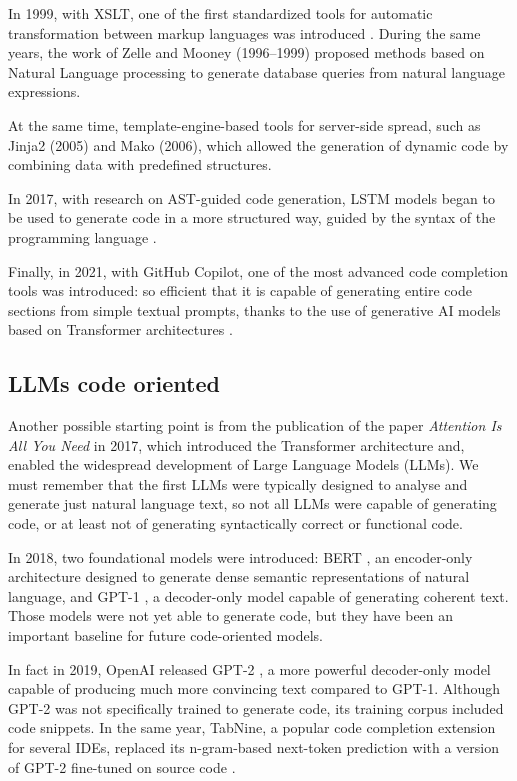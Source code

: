 In 1999, with XSLT, one of the first standardized tools for 
automatic transformation between markup languages was introduced 
\cite{xslt1999}. During the same years, the work of Zelle\cite{zelle1996learning}
and  Mooney\cite{mooney1997nlidb} (1996–1999) 
proposed methods based on Natural Language 
processing to generate database queries from natural language 
expressions.

At the same time, template-engine-based tools  for server-side 
spread, such as Jinja2 (2005)\cite{jinja2docs} 
and Mako (2006)\cite{makoengine}, 
which allowed the generation of 
dynamic code by combining data with predefined structures. 

In 2017, with research on AST-guided code generation, LSTM 
models began to be used to generate code in a more structured 
way, guided by the syntax of the programming language 
\cite{yin2017syntactic}.

Finally, in 2021, with GitHub Copilot, one of the most advanced 
code completion tools was introduced: so efficient that it is 
capable of generating entire code sections from simple textual 
prompts, thanks to the use of generative AI models based on 
Transformer architectures \cite{chen2021codex}.




\subsection{LLMs code oriented} %
Another possible starting point is from the publication of the 
paper \textit{Attention Is All You Need} in 2017, which 
introduced the Transformer architecture \cite{vaswani2017attention}
and, enabled the widespread development of
Large Language Models (LLMs). 
We must remember that the first LLMs were typically designed to 
analyse and generate just natural language text, so not all LLMs 
were capable of generating code, or at least not of 
generating syntactically correct or functional code.

In 2018, two foundational models were introduced: BERT 
\cite{devlin2019bert}, an encoder-only architecture 
designed to generate dense semantic representations of 
natural language, and GPT-1 \cite{radford2018improving}, 
a decoder-only model capable of generating coherent text. 
Those models were not yet able to generate code, but they have been 
an important baseline for future code-oriented models.

In fact in 2019, OpenAI released GPT-2 \cite{radford2019language}, 
a more powerful decoder-only model capable of producing much 
more convincing text compared to GPT-1. Although GPT-2 was 
not specifically trained to generate code, its training 
corpus included code snippets. In the same year, 
TabNine, a popular code completion extension for several IDEs, 
replaced its n-gram-based next-token prediction with a version 
of GPT-2 fine-tuned on source code \cite{tabnine2019}.

